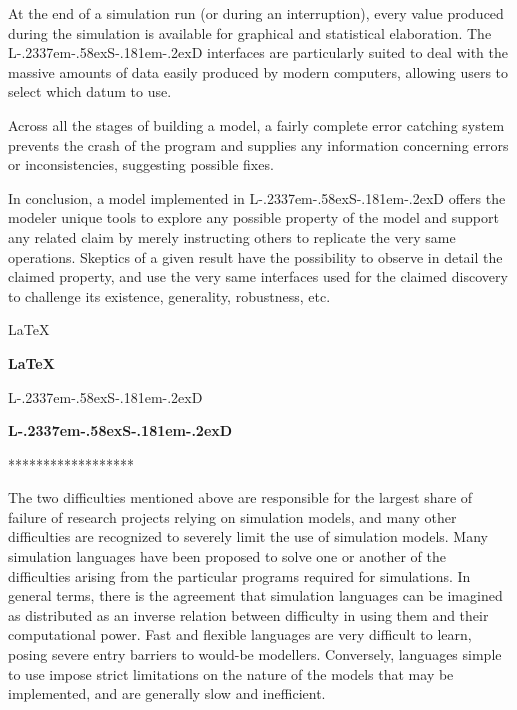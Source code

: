 \documentclass [11pt,a4paper] {book}
\def\LsD{{L\kern-.2337em\lower-.58ex\hbox{S}\kern-.181em\lower-.2ex\hbox{D}}\xspace}
\begin{document}
At the end of a simulation run (or during an interruption), every value produced during the simulation is available for graphical and statistical elaboration. The \LsD interfaces are particularly suited to deal with the massive amounts of data easily produced by modern computers, allowing users to select which datum to use.

Across all the stages of building a model, a fairly complete error catching system prevents the crash of the program and supplies any information concerning errors or inconsistencies, suggesting possible fixes.

In conclusion, a model implemented in \LsD offers the modeler unique tools to explore any possible property of the model and support any related claim by merely instructing others to replicate the very same operations. Skeptics of a given result have the possibility to observe in detail the claimed property, and use the very same interfaces used for the claimed discovery to challenge its existence, generality, robustness, etc. 

\LaTeX

\textbf{\LaTeX}

\LsD

\textbf{\LsD}

****************** 

The two difficulties mentioned above are responsible for the largest share of failure of research projects relying on simulation models, and many other difficulties are recognized to severely limit the use of simulation models. Many  simulation languages have been proposed to solve one or another of the difficulties arising from the particular programs required for simulations. In general terms, there is the agreement that simulation languages can be imagined as distributed as an inverse relation between difficulty in using them and their computational power. Fast and flexible languages are very difficult to learn, posing severe entry barriers to would-be modellers. Conversely, languages simple to use impose strict limitations on the nature of the models that may be implemented, and are generally slow and inefficient.
\end{document}
